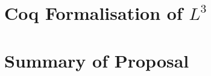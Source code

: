 \documentclass[]{unswthesis}
\begin{document}
\section{Coq Formalisation of $L^3$}

\section{Summary of Proposal}

\backmatter



%
%
\end{document}
